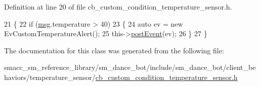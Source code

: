 Definition at line 20 of file cb\+\_\+custom\+\_\+condition\+\_\+temperature\+\_\+sensor.\+h.


\begin{DoxyCode}
21   \{
22     \textcolor{keywordflow}{if} (\hyperlink{namespacekeyboard__node_a768777e12f75b89e4a0a60acf748e9eb}{msg}.temperature > 40)
23     \{
24       \textcolor{keyword}{auto} ev = \textcolor{keyword}{new} EvCustomTemperatureAlert();
25       this->\hyperlink{classsmacc_1_1SmaccClientBehavior_ab29b23145ea074ad69340fc0af6fbb75}{postEvent}(ev);
26     \}
27   \}
\end{DoxyCode}


The documentation for this class was generated from the following file\+:\begin{DoxyCompactItemize}
\item 
smacc\+\_\+sm\+\_\+reference\+\_\+library/sm\+\_\+dance\+\_\+bot/include/sm\+\_\+dance\+\_\+bot/client\+\_\+behaviors/temperature\+\_\+sensor/\hyperlink{cb__custom__condition__temperature__sensor_8h}{cb\+\_\+custom\+\_\+condition\+\_\+temperature\+\_\+sensor.\+h}\end{DoxyCompactItemize}
